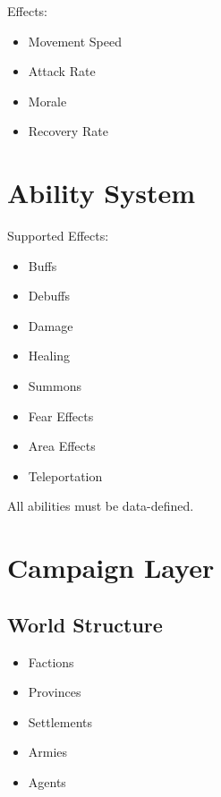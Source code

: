 \documentclass[11pt,a4paper]{article}
\begin{document}
Effects:

\begin{itemize}

    \item Movement Speed

    \item Attack Rate

    \item Morale

    \item Recovery Rate

\end{itemize}

\section{Ability System}

Supported Effects:

\begin{itemize}

    \item Buffs

    \item Debuffs

    \item Damage

    \item Healing

    \item Summons

    \item Fear Effects

    \item Area Effects

    \item Teleportation

\end{itemize}

All abilities must be data-defined.

\section{Campaign Layer}

\subsection{World Structure}

\begin{itemize}

    \item Factions

    \item Provinces

    \item Settlements

    \item Armies

    \item Agents

\end{itemize}
\end{document}
